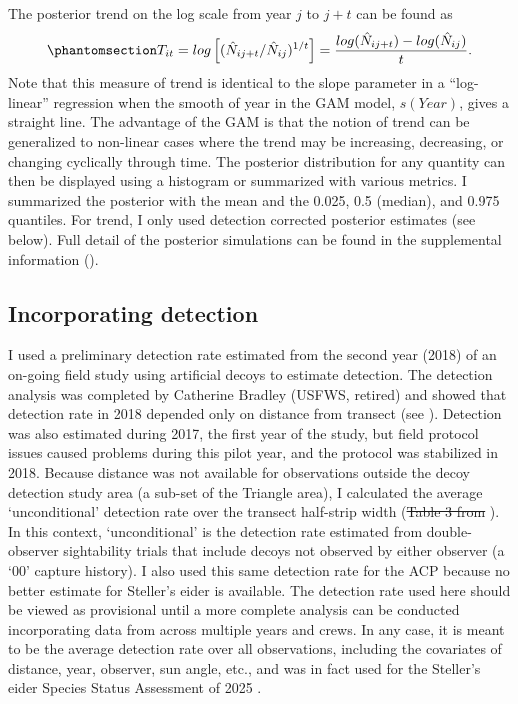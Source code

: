 \documentclass[
  10pt,
  letterpaper,
]{article}
\makeatletter
\providecommand{\DIFdeltex}[1]{{\protect\color{red}\sout{#1}}} %
\providecommand{\DIFdelbegin}{} %
\providecommand{\DIFdelend}{} %
\providecommand{\DIFdel}[1]{\texorpdfstring{\DIFdeltex{#1}}{}} %
\providecommand{\DIFscaledelfig}{0.5}
\newlength{\DIFdelgraphicswidth} %
\newlength{\DIFdelgraphicsheight} %
\providecommand{\DIFdelincludegraphics}[2][]{%
\sbox{\DIFdelgraphicsbox}{\DIFOincludegraphics[#1]{#2}}%
\settoboxwidth{\DIFdelgraphicswidth}{\DIFdelgraphicsbox} %
\settoboxtotalheight{\DIFdelgraphicsheight}{\DIFdelgraphicsbox} %
\scalebox{\DIFscaledelfig}{%
\parbox[b]{\DIFdelgraphicswidth}{\usebox{\DIFdelgraphicsbox}\\[-\baselineskip] \rule{\DIFdelgraphicswidth}{0em}}\llap{\resizebox{\DIFdelgraphicswidth}{\DIFdelgraphicsheight}{%
\setlength{\unitlength}{\DIFdelgraphicswidth}%
\begin{picture}(1,1)%
\thicklines\linethickness{2pt} %
{\color[rgb]{1,0,0}\put(0,0){\framebox(1,1){}}}%
{\color[rgb]{1,0,0}\put(0,0){\line( 1,1){1}}}%
{\color[rgb]{1,0,0}\put(0,1){\line(1,-1){1}}}%
\end{picture}%
}\hspace*{3pt}}} %
} %
\DeclareRobustCommand{\DIFdelbegin}{\DIFOdelbegin \let\includegraphics\DIFdelincludegraphics} %
\DeclareRobustCommand{\DIFdelend}{\DIFOaddend \let\includegraphics\DIFOincludegraphics} %
\let\sout@orig\sout %
\renewcommand{\sout}[1]{\ifmmode\text{\sout@orig{\ensuremath{#1}}}\else\sout@orig{#1}\fi} %
\makeatother
\begin{document}
The posterior trend on the log scale from year \(j\) to \(j+t\) can be
found as
\begin{equation}\phantomsection\label{eq-6}{T_{it} = log \left[ (\hat N_{ij+t}/\hat N_{ij})^{1/t} \right] = \frac{log(\hat N_{ij+t}) - log(\hat N_{ij})}{t}.}\end{equation}
Note that this measure of trend is identical to the slope parameter in a
``log-linear'' regression when the smooth of year in the GAM model,
\(s(Year)\), gives a straight line. The advantage of the GAM is that the
notion of trend can be generalized to non-linear cases where the trend
may be increasing, decreasing, or changing cyclically through time. The
posterior distribution for any quantity can then be displayed using a
histogram or summarized with various metrics. I summarized the posterior
with the mean and the 0.025, 0.5 (median), and 0.975 quantiles. For
trend, I only used detection corrected posterior estimates (see below).
Full detail of the posterior simulations can be found in the
supplemental information ().

\subsection{Incorporating detection}\label{incorporating-detection}

I used a preliminary detection rate estimated from the second year
(2018) of an on-going field study using artificial decoys to estimate
detection. The detection analysis was completed by Catherine Bradley
(USFWS, retired) and showed that detection rate in 2018 depended only on
distance from transect (see ). Detection was also
estimated during 2017, the first year of the study, but field protocol
issues caused problems during this pilot year, and the protocol was
stabilized in 2018. Because distance was not available for observations
outside the decoy detection study area (a sub-set of the Triangle area),
I calculated the average `unconditional' detection rate over the
transect half-strip width (\DIFdelbegin \DIFdel{Table 3 from }\DIFdelend {}). In this
context, `unconditional' is the detection rate estimated from
double-observer sightability trials that include decoys not observed by
either observer (a `00' capture history). I also used this same
detection rate for the ACP because no better estimate for Steller's
eider is available. The detection rate used here should be viewed as
provisional until a more complete analysis can be conducted
incorporating data from across multiple years and crews. In any case, it
is meant to be the average detection rate over all observations,
including the covariates of distance, year, observer, sun angle, etc.,
and was in fact used for the Steller's eider Species Status Assessment
of 2025 \citep{steiSSA2025}.
\end{document}
